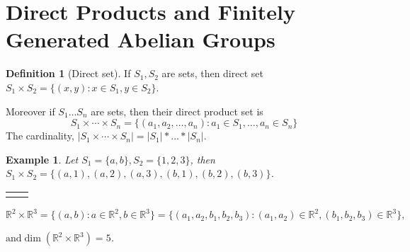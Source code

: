 \documentclass{article}
\theoremstyle{MyNonumberplain}
\theoremstyle{break}
\newcommand{\nline}{\begin{tabular}{ll}&\\\end{tabular}}
\theoremstyle{break}
\newtheorem{example}{Example}[section]
\theoremstyle{break}
\theoremstyle{definition}
\theoremstyle{break}
\newtheorem{definition}{Definition}[section]
\begin{document}
\newpage

\section{Direct Products and Finitely Generated Abelian Groups}

\begin{defbox}
    \begin{definition}[Direct set]
        If $S_1, S_2$ are sets, then direct set $S_1 \times S_2 = \{ (x, y) : x \in
        S_1, y \in S_2 \}$.

        Moreover if $S_1 \ldots S_n$ are sets, then their direct product set is
        \[ S_1 \times \cdots \times S_n = \{ (a_1, a_2, \ldots, a_n) : a_1 \in S_1,
        \ldots, a_n \in S_n \} \]
        The cardinality, $| S_1 \times \cdots \times S_n | = | S_1 | \ast \ldots \ast
        | S_n |$.
    \end{definition}
\end{defbox}

\begin{expbox}
    \begin{example}
        Let $S_1 = \{ a, b \}, S_2 = \{ 1, 2, 3 \}$, then $S_1 \times S_2 = \{ (a, 1),
        (a, 2), (a, 3), (b, 1), (b, 2), (b, 3) \}$.

        \nline

        $\mathbb{R}^2 \times \mathbb{R}^3 = \{ (a, b) : a \in \mathbb{R}^2, b \in
        \mathbb{R}^3 \} = \{ (a_1, a_2, b_1, b_2, b_3) : (a_1, a_2) \in \mathbb{R}^2,
        (b_1, b_2, b_3) \in \mathbb{R}^3 \},$
        
        $\text{and} \dim (\mathbb{R}^2 \times \mathbb{R}^3) = 5$.
    \end{example}
\end{expbox}
\end{document}
